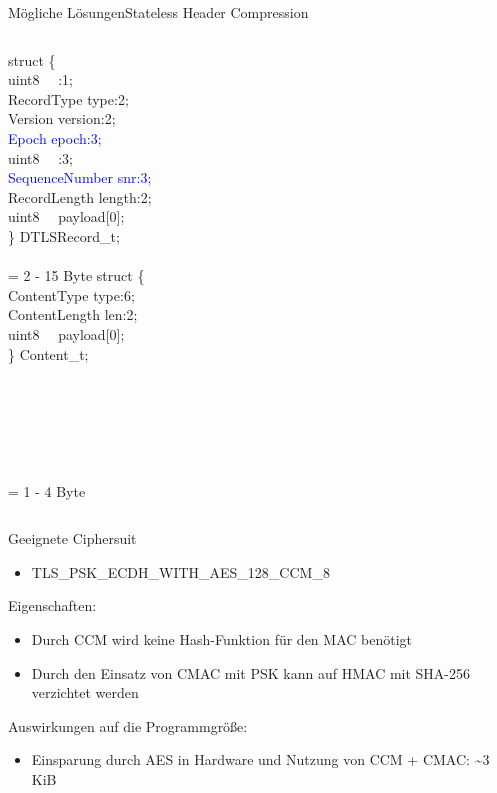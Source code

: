 \documentclass{beamer}
\begin{document}
\begin{frame}{Mögliche Lösungen}{Stateless Header Compression}
  \begin{columns}
      struct \{\\
      \qquad uint8 ~~:1;\\
      \qquad RecordType type:2;\\
      \qquad Version version:2;\\
      \qquad \textcolor{blue}{Epoch epoch:3;}\\
      \qquad uint8 ~~:3;\\
      \qquad \textcolor{blue}{SequenceNumber snr:3;}\\
      \qquad RecordLength length:2;\\
      \qquad uint8 ~~payload[0];\\
      \} DTLSRecord\_t;\\
      ~\\
      = 2 - 15 Byte
      struct \{\\
      \qquad ContentType type:6;\\
      \qquad ContentLength len:2;\\
      \qquad uint8 ~~payload[0];\\
      \} Content\_t;\\
      ~\\
      ~\\
      ~\\
      ~\\
      ~\\
      ~\\
      = 1 - 4 Byte
  \end{columns}
\end{frame}

\begin{frame}{Geeignete Ciphersuit}
  \begin{itemize}
    \item TLS\_PSK\_ECDH\_WITH\_AES\_128\_CCM\_8
  \end{itemize}
  Eigenschaften:
  \begin{itemize}
    \item Durch CCM wird keine Hash-Funktion \newline für den MAC benötigt
    \item Durch den Einsatz von CMAC mit PSK kann \newline auf HMAC mit SHA-256 verzichtet werden
  \end{itemize}
  Auswirkungen auf die Programmgröße:
  \begin{itemize}
    \item Einsparung durch AES in Hardware \newline und Nutzung von CCM + CMAC: \textasciitilde 3 KiB
  \end{itemize}
\end{frame}
\end{document}
